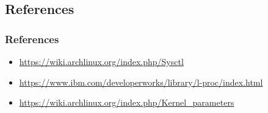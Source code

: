 \documentclass{beamer}
\begin{document}
\begin{frame}
	\section{References}
	\frametitle{References}
	\begin{itemize}
		\item \url{https://wiki.archlinux.org/index.php/Sysctl}
		\item \url{https://www.ibm.com/developerworks/library/l-proc/index.html}
		\item \url{https://wiki.archlinux.org/index.php/Kernel_parameters}
	\end{itemize}
\end{frame}
\end{document}
